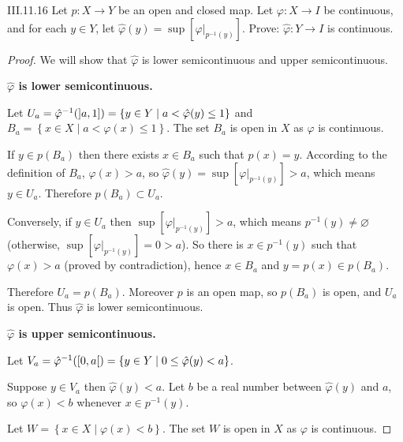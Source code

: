 \begin{problem}{III.11.16}
Let \( p: X \to Y \) be an open and closed map. Let \( \varphi: X \to I \) be continuous, and for each \( y \in Y \), let \( \hat{\varphi}(y) = \sup \left\lbrack\varphi\vert_{p^{-1}(y)} \right\rbrack \). Prove: \( \hat{\varphi}: Y \to I \) is continuous.
\end{problem}

\begin{proof}
    We will show that \( \hat{\varphi} \) is lower semicontinuous and upper semicontinuous.

    \textbf{\( \hat{\varphi} \) is lower semicontinuous.}

    Let \( U_{a} = \hat{\varphi}^{-1}(\left\rbrack{a, 1}\right\rbrack) = \left\{ y \in Y \mid a < \hat{\varphi}(y) \le 1 \right\} \) and \( B_{a} = \left\{ x \in X \mid a < \varphi(x) \le 1 \right\} \). The set \( B_{a} \) is open in \( X \) as \( \varphi \) is continuous.

    If \( y \in p(B_{a}) \) then there exists \( x \in B_{a} \) such that \( p(x) = y \). According to the definition of \( B_{a} \), \( \varphi(x) > a \), so \( \hat{\varphi}(y) = \sup \left\lbrack \varphi\vert_{p^{-1}(y)} \right\rbrack > a \), which means \( y \in U_{a} \). Therefore \( p(B_{a}) \subset U_{a} \).

    Conversely, if \( y \in U_{a} \) then \( \sup \left\lbrack \varphi\vert_{p^{-1}(y)} \right\rbrack > a \), which means \( p^{-1}(y) \ne \varnothing \) (otherwise, \( \sup \left\lbrack \varphi\vert_{p^{-1}(y)} \right\rbrack = 0 > a \)). So there is \( x \in p^{-1}(y) \) such that \( \varphi(x) > a \) (proved by contradiction), hence \( x \in B_{a} \) and \( y = p(x) \in p(B_{a}) \).

    Therefore \( U_{a} = p(B_{a}) \). Moreover \( p \) is an open map, so \( p(B_{a}) \) is open, and \( U_{a} \) is open. Thus \( \hat{\varphi} \) is lower semicontinuous.

    \textbf{\( \hat{\varphi} \) is upper semicontinuous.}

    Let \( V_{a} = \hat{\varphi}^{-1}(\left\lbrack{0, a}\right\lbrack) = \left\{ y \in Y \mid 0 \le \hat{\varphi}(y) < a \right\} \).

    Suppose \( y \in V_{a} \) then \( \hat{\varphi}(y) < a \). Let \( b \) be a real number between \( \hat{\varphi}(y) \) and \( a \), so \( \varphi(x) < b \) whenever \( x \in p^{-1}(y) \).

    Let \( W = \left\{ x \in X \mid \varphi(x) < b \right\} \). The set \( W \) is open in \( X \) as \( \varphi \) is continuous.


\end{proof}
